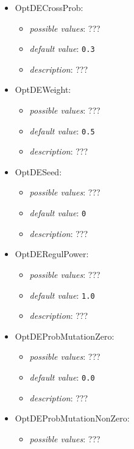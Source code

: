 \documentclass{article}
\begin{document}
\begin{itemize}
\begin{itemize}
           \end{itemize}
    \item OptDECrossProb:
           \begin{itemize}
                \item \emph{possible values}: ???
                \item \emph{default value}: \texttt{0.3}
                \item \emph{description}: ???
           \end{itemize}
    \item OptDEWeight:
           \begin{itemize}
                \item \emph{possible values}: ???
                \item \emph{default value}: \texttt{0.5}
                \item \emph{description}: ???
           \end{itemize}
    \item OptDESeed:
           \begin{itemize}
                \item \emph{possible values}: ???
                \item \emph{default value}: \texttt{0}
                \item \emph{description}: ???
           \end{itemize}
    \item OptDERegulPower:
           \begin{itemize}
                \item \emph{possible values}: ???
                \item \emph{default value}: \texttt{1.0}
                \item \emph{description}: ???
           \end{itemize}
    \item OptDEProbMutationZero:
           \begin{itemize}
                \item \emph{possible values}: ???
                \item \emph{default value}: \texttt{0.0}
                \item \emph{description}: ???
           \end{itemize}
    \item OptDEProbMutationNonZero:
           \begin{itemize}
                \item \emph{possible values}: ???

\end{itemize}
\end{itemize}
\end{document}
